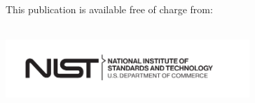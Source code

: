 	\begin{titlepage}
		\begin{flushright}
\LARGE{}\\
\LARGE{\sffamily{\textbf{\pubnumber}}}\\
\vfill
\Huge{\sffamily{\textbf{\pubtitle}}}\\
\Large{\sffamily{\textit{\pubsubtitle}}}\\
\vfill
\large \authorone\\
\large \authortwo\\
\large \authorthree\\
\large \authorfour\\
\vfill
\normalsize This publication is available free of charge from:\\
\DOI\\
\vfill

\includegraphics[trim=0 0 0.7in 0,clip,width=3.62in]{../FIGURES/NIST-Logo-Brand-Black-2022.pdf}\\ 

\end{flushright}
\end{titlepage}
